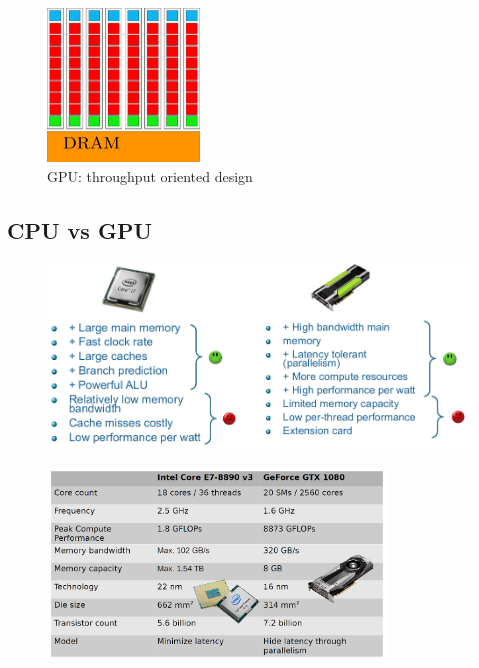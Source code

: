 \begin{figure}[ht]
	\centering
	\includegraphics[width=0.36\textwidth]{figure_parallel/GPU.png}
	\caption{GPU: throughput oriented design}
\end{figure}
\FloatBarrier

\subsection{CPU vs GPU}

\begin{figure}[ht]
	\centering
	\includegraphics[width=1\textwidth]{figure_parallel/cpu_vs_gpu.png}
\end{figure}
\FloatBarrier


\begin{figure}[ht]
	\centering
	\includegraphics[width=0.8\textwidth]{figure_parallel/cpu_vs_gpu_table.png}
\end{figure}
\FloatBarrier

